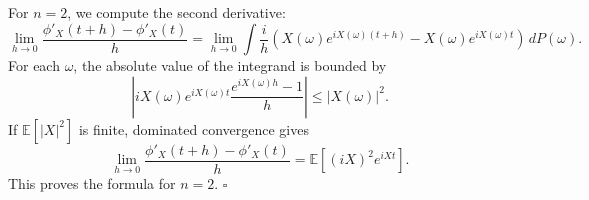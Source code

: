 For $n=2$, we compute the second derivative:
\[
\lim_{h\to 0}\frac{\phi'_X(t+h)-\phi'_X(t)}{h}
=\lim_{h\to 0}\int \frac{i}{h}
\left(X(\omega)e^{iX(\omega)(t+h)}-X(\omega)e^{iX(\omega)t}\right)\,dP(\omega).
\]
For each $\omega$, the absolute value of the integrand is bounded by
\[
\left\lvert
iX(\omega)e^{iX(\omega)t}\frac{e^{iX(\omega)h}-1}{h}
\right\rvert
\leq \lvert X(\omega)\rvert^2.
\]
If $\mathbb{E}[\lvert X\rvert^2]$ is finite, dominated convergence gives
\[
\lim_{h\to 0}\frac{\phi'_X(t+h)-\phi'_X(t)}{h}
=\mathbb{E}[(iX)^2e^{iXt}].
\]
This proves the formula for $n=2$.
\hfill $\square$
